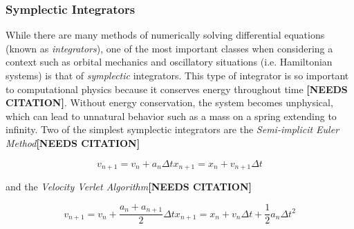 \documentclass{report}
\begin{document}
            \subsubsection{Symplectic Integrators}

                While there are many methods of numerically solving differential equations (known as \emph{integrators}), one of the most important classes when considering a context such as orbital mechanics and oscillatory situations (i.e. Hamiltonian systems) is that of \emph{symplectic} integrators.  This type of integrator is so important to computational physics because it conserves energy throughout time \textbf{[NEEDS CITATION]}.  Without energy conservation, the system becomes unphysical, which can lead to unnatural behavior such as a mass on a spring extending to infinity.  Two of the simplest symplectic integrators are the \emph{Semi-implicit Euler Method}\textbf{[NEEDS CITATION]}

                \begin{subequations} \label{eq:semiEuler}
                    \begin{equation}
                        v_{n+1} = v_n + a_n \Delta t
                    \end{equation}
                    \begin{equation}
                        x_{n + 1} = x_n + v_{n+1} \Delta t
                    \end{equation}
                \end{subequations}

                and the \emph{Velocity Verlet Algorithm}\textbf{[NEEDS CITATION]}

                \begin{subequations} \label{eq:verlet}
                    \begin{equation}
                        v_{n+1} = v_n + \frac{a_n + a_{n+1}}{2} \Delta t
                    \end{equation}
                    \begin{equation}
                        x_{n + 1} = x_n + v_{n} \Delta t + \frac{1}{2} a_n \Delta t^2
                    \end{equation}
                \end{subequations}
\end{document}
